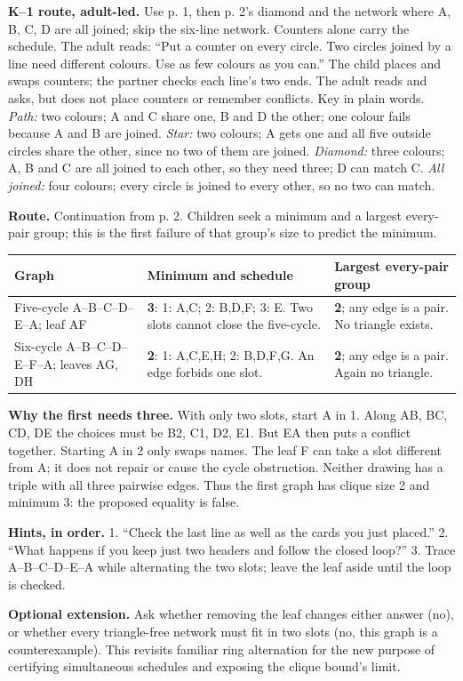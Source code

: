 \documentclass[10pt,letterpaper]{article}
\newcommand{\topic}[1]{\vspace{3pt}{\large\bfseries #1}\par}
\newcommand{\labelled}[2]{\textbf{#1} #2\par}
\newcommand{\hint}[1]{\textbf{Hints, in order.} #1\par}
\newcommand{\route}[1]{\textbf{Route.} #1\par}
\begin{document}
\labelled{K--1 route, adult-led.}{Use p. 1, then p. 2's diamond and the network where A, B, C, D are all joined; skip the six-line network. Counters alone carry the schedule. The adult reads: ``Put a counter on every circle. Two circles joined by a line need different colours. Use as few colours as you can.'' The child places and swaps counters; the partner checks each line's two ends. The adult reads and asks, but does not place counters or remember conflicts. Key in plain words. \emph{Path:} two colours; A and C share one, B and D the other; one colour fails because A and B are joined. \emph{Star:} two colours; A gets one and all five outside circles share the other, since no two of them are joined. \emph{Diamond:} three colours; A, B and C are all joined to each other, so they need three; D can match C. \emph{All joined:} four colours; every circle is joined to every other, so no two can match.}
\newpage
\topic{Student p. 3 / Problem 3: a clique can miss the obstruction}
\route{Continuation from p. 2. Children seek a minimum and a largest every-pair group; this is the first failure of that group's size to predict the minimum.}
\begin{tabularx}{\linewidth}{@{}p{1.12in}Xp{1.35in}@{}}
\toprule
Graph & Minimum and schedule & Largest every-pair group \\
\midrule
Five-cycle A--B--C--D--E--A; leaf AF & \textbf{3}: 1: A,C; 2: B,D,F; 3: E. Two slots cannot close the five-cycle. & \textbf{2}; any edge is a pair. No triangle exists. \\
Six-cycle A--B--C--D--E--F--A; leaves AG, DH & \textbf{2}: 1: A,C,E,H; 2: B,D,F,G. An edge forbids one slot. & \textbf{2}; any edge is a pair. Again no triangle. \\
\bottomrule
\end{tabularx}\par\smallskip
\labelled{Why the first needs three.}{With only two slots, start A in 1. Along AB, BC, CD, DE the choices must be B2, C1, D2, E1. But EA then puts a conflict together. Starting A in 2 only swaps names. The leaf F can take a slot different from A; it does not repair or cause the cycle obstruction. Neither drawing has a triple with all three pairwise edges. Thus the first graph has clique size 2 and minimum 3: the proposed equality is false.}
\hint{1. ``Check the last line as well as the cards you just placed.'' 2. ``What happens if you keep just two headers and follow the closed loop?'' 3. Trace A--B--C--D--E--A while alternating the two slots; leave the leaf aside until the loop is checked.}
\labelled{Optional extension.}{Ask whether removing the leaf changes either answer (no), or whether every triangle-free network must fit in two slots (no, this graph is a counterexample). This revisits familiar ring alternation for the new purpose of certifying simultaneous schedules and exposing the clique bound's limit.}
\end{document}
